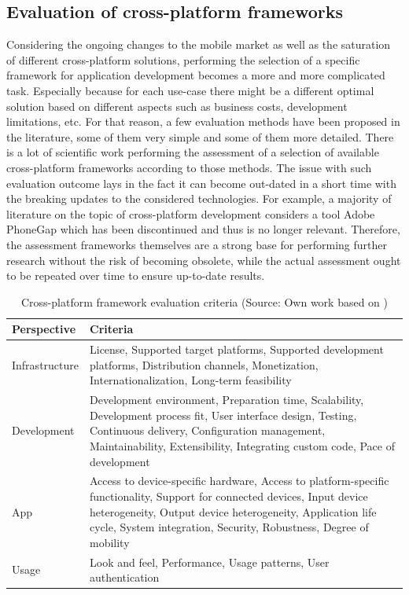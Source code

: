 \subsection{Evaluation of cross-platform frameworks}\label{chap:eval_cross_platform}

Considering the ongoing changes to the mobile market as well as the saturation of different cross-platform solutions, performing the selection of a specific framework for application development becomes a more and more complicated task. Especially because for each use-case there might be a different optimal solution based on different aspects such as business costs, development limitations, etc. For that reason, a few evaluation methods have been proposed in the literature, some of them very simple and some of them more detailed. There is a lot of scientific work performing the assessment of a selection of available cross-platform frameworks according to those methods. The issue with such evaluation outcome lays in the fact it can become out-dated in a short time with the breaking updates to the considered technologies. For example, a majority of literature on the topic of cross-platform development considers a tool Adobe PhoneGap which has been discontinued and thus is no longer relevant. Therefore, the assessment frameworks themselves are a strong base for performing further research  without the risk of becoming obsolete, while the actual assessment ought to be repeated over time to ensure up-to-date results.

\begin{table}[h]
    \centering
    \caption{Cross-platform framework evaluation criteria (Source: Own work based on \cite{rieger_eval_cp})}
    \label{tab:eval_criteria}
    \begin{tabular}{ |l|p{}| }
        \hline
        \textbf{Perspective}&\textbf{Criteria}\\
        \hline
        Infrastructure&License, Supported target platforms, Supported development platforms, Distribution channels, Monetization, Internationalization, Long-term feasibility\\
        \hline
        Development&Development environment, Preparation time, Scalability, Development process fit, User interface design, Testing, Continuous delivery, Configuration management, Maintainability, Extensibility, Integrating custom code, Pace of development\\
        \hline
        App&Access to device-specific hardware, Access to platform-specific functionality, Support for connected devices, Input device heterogeneity, Output device heterogeneity, Application life cycle, System integration, Security, Robustness, Degree of mobility \\
        \hline
        Usage&Look and feel, Performance, Usage patterns, User authentication\\
        \hline
    \end{tabular}
\end{table}

